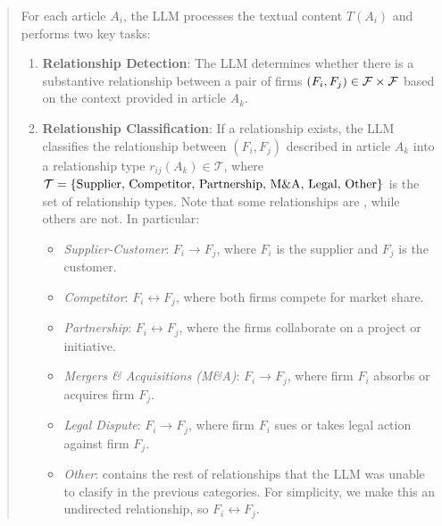 \begin{quote}
For each article $ A_i $, the LLM processes the textual content $ T(A_i) $ and performs two key tasks:
\begin{enumerate}
    \item \textbf{Relationship Detection}: The LLM determines whether there is a substantive relationship between a pair of firms $(F_i,F_j)\in\mathcal{F}\times\mathcal{F}$ based on the context provided in article $A_k$.
    \item \textbf{Relationship Classification}: If a relationship exists, the LLM classifies the relationship between $(F_i,F_j)$ described in article $A_k$ into a relationship type $ r_{ij}(A_k) \in \mathcal{T} $, where $\mathcal{T}=\{\text{Supplier, Competitor, Partnership, M\&A, Legal, Other}\}$ is the set of relationship types. Note that some relationships are , while others are not. In particular:
    \begin{itemize}
        \item \textit{Supplier-Customer}: $ F_i \to F_j $, where $ F_i $ is the supplier and $ F_j $ is the customer.
        \item \textit{Competitor}: $ F_i \leftrightarrow F_j $, where both firms compete for market share.
        \item \textit{Partnership}: $ F_i \leftrightarrow F_j $, where the firms collaborate on a project or initiative.
        \item \textit{Mergers \& Acquisitions (M\&A)}: $ F_i \to F_j $, where firm $ F_i $ absorbs or acquires firm $ F_j $.
        \item \textit{Legal Dispute}: $ F_i \to F_j $, where firm $ F_i $ sues or takes legal action against firm $ F_j $.
        \item \textit{Other}: contains the rest of relationships that the LLM was unable to clasify in the previous categories. For simplicity, we make this an undirected relationship, so $F_i\leftrightarrow F_j$. 
    \end{itemize}
\end{enumerate}


\end{quote}
